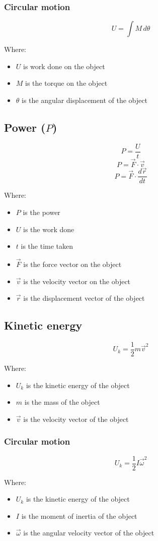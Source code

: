 \documentclass[11pt]{article}
\begin{document}
\subsubsection{Circular motion}
\label{sec:org27e88e3}
\[U = \int M \, d \theta\]

Where:
\begin{itemize}
\item \(U\) is work done on the object
\item \(M\) is the torque on the object
\item \(\theta\) is the angular displacement of the object
\end{itemize}
\subsection{Power (\(P\))}
\label{sec:org2fe19a8}
\[P = \frac{U}{t}\]
\[P = \vec{F} \cdot \vec{v}\]
\[P = \vec{F} \cdot \frac{d \vec{r}}{dt}\]

Where:
\begin{itemize}
\item \(P\) is the power
\item \(U\) is the work done
\item \(t\) is the time taken
\item \(\vec{F}\) is the force vector on the object
\item \(\vec{v}\) is the velocity vector on the object
\item \(\vec{r}\) is the displacement vector of the object
\end{itemize}
\subsection{Kinetic energy}
\label{sec:org69e34be}
\[U_k = \frac{1}{2} m \vec{v}^2\]

Where:
\begin{itemize}
\item \(U_k\) is the kinetic energy of the object
\item \(m\) is the mass of the object
\item \(\vec{v}\) is the velocity vector of the object
\end{itemize}
\subsubsection{Circular motion}
\label{sec:org328a263}
\[U_k = \frac{1}{2} I \vec{\omega}^2\]

Where:
\begin{itemize}
\item \(U_k\) is the kinetic energy of the object
\item \(I\) is the moment of inertia of the object
\item \(\vec{\omega}\) is the angular velocity vector of the object
\end{itemize}
\end{document}
